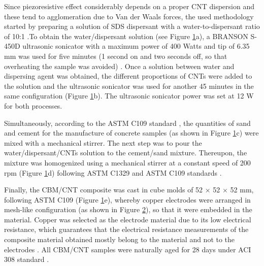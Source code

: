 \documentclass[twocolumn]{bmcart}%
\begin{document}
Since piezoresistive effect considerably depends on a proper CNT dispersion and these tend to agglomeration due to Van der Waals forces, the used methodology started by preparing a solution of SDS dispersant with a water-to-dispersant ratio of 10:1 \cite{Shao2017, Noh2013, Lee2017, Collins2012}.To obtain the water/dispersant solution (see Figure \ref{fig1}a), a BRANSON S-450D ultrasonic sonicator  with a maximum power of 400 Watts and tip of 6.35 mm was used for five minutes (1 second on and two seconds off, so that overheating the sample was avoided) \cite{Konsta-gdoutos2010, Konsta-Gdoutos2014}. Once a solution between water and dispersing agent was obtained, the different proportions of CNTs were added to the solution and the ultrasonic sonicator was used for another 45 minutes in the same configuration (Figure \ref{fig1}b). The ultrasonic sonicator power was set at 12 W for both processes.

\begin{figure}[h!]
  \caption{
      }
   \label{fig1}
      \end{figure}

Simultaneously, according to the ASTM C109 standard \cite{Qiao2012}, the quantities of sand and cement for the manufacture of concrete samples (as shown in Figure \ref{fig1}c) were mixed with a mechanical stirrer. The next step was to pour the water/dispersant/CNTs solution to the cement/sand mixture.  Thereupon, the mixture was homogenized using a mechanical stirrer at a constant speed of 200 rpm (Figure \ref{fig1}d) following ASTM C1329 and ASTM C109 standards \cite{Collins2012, AmericanSocietyforTestingandMaterials2014}.

\begin{figure}[h!]
  \caption{
  \label{fig2}
      }
      \end{figure}

Finally, the  CBM/CNT composite was cast in cube molds of 52 $\times$ 52 $\times$ 52 mm, following ASTM C109 \cite{ASTMC1092000} (Figure \ref{fig1}e), whereby copper electrodes were arranged in mesh-like configuration (as shown in Figure \ref{fig2}), so that it were embedded in the material. Copper was selected as the electrode material due to its low electrical resistance, which guarantees that the electrical resistance measurements of the composite material obtained mostly belong to the material and not to the electrodes \cite{Kim2016}. All CBM/CNT samples were naturally aged for 28 days under ACI 308 standard \cite{ACICommittee3082016}.
\end{document}
